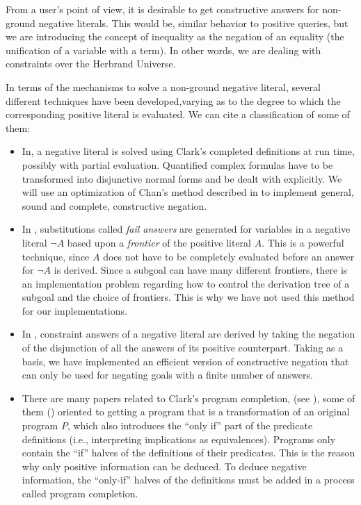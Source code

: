 \documentclass{tlp}
\begin{document}
From a user's point of view, it is desirable to get constructive
answers for non-ground negative literals. This would be, similar
behavior to positive queries, but we are introducing the concept of
inequality as the negation of an equality (the unification of a
variable with a term). In other words, we are dealing with
constraints over the Herbrand Universe.
 
In terms of the mechanisms to solve a non-ground negative literal,
several different techniques have been developed,varying as to the
degree to which the corresponding positive literal is evaluated. We
can cite a classification of some of them:
\begin{itemize}

\item In\cite{Chan2,Stuckey,Wallace}, a negative literal is solved
using Clark's completed definitions at run time, possibly with partial
evaluation. Quantified complex formulas have to be transformed into
disjunctive normal forms and be dealt with explicitly. We will use an
optimization of Chan's method described in \cite{Chan2} to implement
general, sound and complete, constructive negation.%

\item In \cite{Drabent,Fages,Malus}, substitutions called \emph{fail
answers} are generated for variables in a negative literal $\neg A$
based upon a \emph{frontier} of the positive literal $A$. This is a
powerful technique, since $A$ does not have to be completely evaluated
before an answer for $\neg A$ is derived. Since a subgoal can have
many different frontiers, there is an implementation problem regarding
how to control the derivation tree of a subgoal and the choice of
frontiers. This is why we have not used this method for our
implementations.

\item In \cite{Bossu,Chan1,Damasio,Khabaza,Przymusinski2},
constraint answers of a negative literal are derived by taking the
negation of the disjunction of all the answers of its positive
counterpart. Taking \cite{Chan1} as a basis, we have implemented an
efficient version of constructive negation that can only be used for
negating goals with a finite number of answers. %


\item There are many papers related to Clark's \cite{Clark} program
  completion, (see \cite{Lloyd,Apt}), some of them
(\cite{Barbuti1,Barbuti2}) oriented to getting a program that is a
transformation of an original program $P$, which also introduces the
``only if'' part of the predicate definitions (i.e., interpreting
implications as equivalences). Programs only contain the ``if'' halves of
the definitions of their predicates. This is the reason why only
positive information can be deduced. To deduce negative
information, the ``only-if'' halves of the definitions must be added in
a process called program completion.

\end{itemize}
\end{document}
